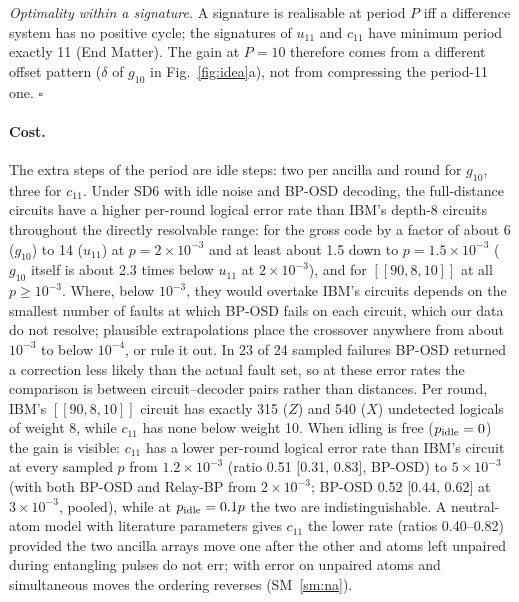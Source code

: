 \documentclass[aps,prl,twocolumn,superscriptaddress,nofootinbib]{revtex4-2}
\newif\ifshowclaimtags \showclaimtagsfalse
\newcommand{\cl}[1]{\ifshowclaimtags\textsuperscript{\textcolor{blue}{\scriptsize[#1]}}\fi}
\newcommand{\code}[1]{[[#1]]}
\begin{document}
\emph{Optimality within a signature.} A signature is realisable at period $P$ iff a
difference system has no positive cycle; the signatures of $u_{11}$ and $c_{11}$ have
minimum period exactly 11 (End Matter)\cl{L-16}. The gain at $P=10$ therefore comes from a
different offset pattern ($\delta$ of $g_{10}$ in Fig.~\ref{fig:idea}a), not from compressing
the period-11 one. $\square$

\paragraph{Cost.}
The extra steps of the period are idle steps: two per ancilla and round for $g_{10}$, three
for $c_{11}$. Under SD6 with idle noise and BP-OSD decoding, the full-distance circuits have
a higher per-round logical error rate than IBM's depth-8 circuits throughout the directly
resolvable range: for the gross code by a factor of about 6 ($g_{10}$) to 14 ($u_{11}$) at $p=2\times10^{-3}$ and
at least about 1.5 down to $p=1.5\times10^{-3}$ ($g_{10}$ itself is about 2.3 times below
$u_{11}$ at $2\times10^{-3}$), and for $\code{90,8,10}$ at all $p\ge10^{-3}$. Where, below
$10^{-3}$, they would overtake IBM's circuits depends on the smallest number of faults at
which BP-OSD fails on each circuit, which our data do not resolve; plausible extrapolations
place the crossover anywhere from about $10^{-3}$ to below $10^{-4}$, or rule it out. In 23 of 24
sampled failures BP-OSD returned a correction less likely than the actual fault set, so at
these error rates the comparison is between circuit--decoder pairs rather than distances.
Per round, IBM's $\code{90,8,10}$ circuit has exactly 315 ($Z$) and 540 ($X$) undetected
logicals of weight 8, while $c_{11}$ has none below weight 10\cl{L-17}. When idling is free ($p_{\rm idle}=0$) the gain is visible:
$c_{11}$ has a lower per-round logical error rate than IBM's circuit at every sampled $p$
from $1.2\times10^{-3}$ (ratio 0.51 [0.31, 0.83], BP-OSD) to $5\times10^{-3}$ (with both
BP-OSD and Relay-BP from $2\times10^{-3}$; BP-OSD 0.52 [0.44, 0.62] at $3\times10^{-3}$, pooled), while at
$p_{\rm idle}=0.1p$ the two are indistinguishable\cl{L-18}. A neutral-atom model with
literature parameters gives $c_{11}$ the lower rate (ratios 0.40--0.82) provided the two
ancilla arrays move one after the other and atoms left unpaired during entangling pulses do
not err; with error on unpaired atoms and simultaneous moves the ordering reverses
(SM~\ref{sm:na})\cl{L-19}.
\end{document}
